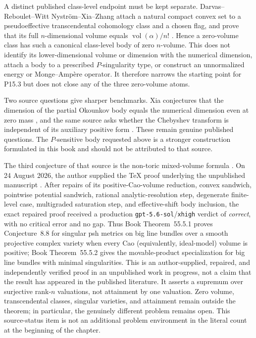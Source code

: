 \documentclass[11pt,a4paper]{article}
\theoremstyle{definition}
\theoremstyle{remark}
\begin{document}
A distinct published class-level endpoint must be kept separate.
Darvas--Reboulet--Witt Nystr\"om--Xia--Zhang attach a natural compact
convex set to a pseudoeffective transcendental cohomology class and a
chosen flag, and prove that its full \(n\)-dimensional volume equals
\(\operatorname{vol}(\alpha)/n!\) \cite[pp.~135--136]{DRWNXZ}.  Hence a
zero-volume class has such a canonical class-level body of zero
\(n\)-volume.  This does not identify its lower-dimensional volume or
dimension with the numerical dimension, attach a body to a prescribed
\(P\)-singularity type, or construct an unnormalized energy or
Monge--Amp\`ere operator.  It therefore narrows the starting point for
P15.3 but does not close any of the three zero-volume atoms.

Two source questions give sharper benchmarks.  Xia conjectures that the
dimension of the partial Okounkov body equals the numerical dimension even
at zero mass \cite[Conjecture~5.29]{Xia21}, and the same source asks whether
the Chebyshev transform is independent of its auxiliary positive form
\cite[p.~34]{Xia21}.  These remain genuine published questions.  The
\(P\)-sensitive body requested above is a stronger construction formulated
in this book and should not be attributed to that source.

The third conjecture of that source is the non-toric mixed-volume formula
\cite[Conjecture~8.8]{Xia21}.  On 24 August 2026, the author supplied the TeX
proof underlying the unpublished manuscript \cite{XiaMVOB}.  After repairs
of its positive-Cao-volume reduction, convex sandwich, pointwise potential
sandwich, rational analytic-resolution step, degenerate finite-level case,
multigraded saturation step, and effective-shift body inclusion, the exact
repaired proof received a production \texttt{gpt-5.6-sol}/\texttt{xhigh}
verdict of \emph{correct}, with no critical error and no gap.  Thus
Book Theorem~55.5.1 proves Conjecture~8.8 for singular psh metrics on
big line bundles over a smooth projective complex variety when every Cao
(equivalently, ideal-model) volume is positive;
Book Theorem~55.5.2 gives the movable-product specialization for
big line bundles with minimal singularities.  This is an author-supplied,
repaired, and independently verified proof in an unpublished work in
progress, not a claim that the result has appeared in the published
literature.  It asserts a supremum over surjective rank-\(n\) valuations,
not attainment by one valuation.  Zero volume, transcendental classes,
singular varieties, and attainment remain outside the theorem; in
particular, the genuinely different problem
 remains open.
This source-status item is not an additional problem environment in the
literal count at the beginning of the chapter.
\end{document}
